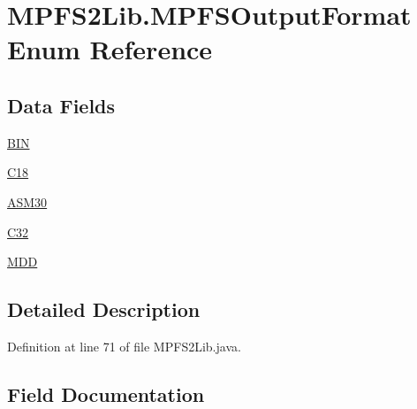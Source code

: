 \hypertarget{enum_microchip_m_p_f_s_1_1_m_p_f_s2_lib_1_1_m_p_f_s_output_format}{}\section{M\+P\+F\+S2\+Lib.\+M\+P\+F\+S\+Output\+Format Enum Reference}
\label{enum_microchip_m_p_f_s_1_1_m_p_f_s2_lib_1_1_m_p_f_s_output_format}
\subsection*{Data Fields}
\begin{DoxyCompactItemize}
\item 
\hyperlink{enum_microchip_m_p_f_s_1_1_m_p_f_s2_lib_1_1_m_p_f_s_output_format_a4cdf0b70265066d6127339b05fd497c1}{B\+I\+N}
\item 
\hyperlink{enum_microchip_m_p_f_s_1_1_m_p_f_s2_lib_1_1_m_p_f_s_output_format_a338879506caa10fad538c03074adf583}{C18}
\item 
\hyperlink{enum_microchip_m_p_f_s_1_1_m_p_f_s2_lib_1_1_m_p_f_s_output_format_acb7365f33cd0e4fd80d250fb72ba39d5}{A\+S\+M30}
\item 
\hyperlink{enum_microchip_m_p_f_s_1_1_m_p_f_s2_lib_1_1_m_p_f_s_output_format_a6ed5f7b9838aba43c103d45888a7dcf3}{C32}
\item 
\hyperlink{enum_microchip_m_p_f_s_1_1_m_p_f_s2_lib_1_1_m_p_f_s_output_format_a243d004bf4bcbc53e81b2d5fecfe17b8}{M\+D\+D}
\end{DoxyCompactItemize}


\subsection{Detailed Description}


Definition at line 71 of file M\+P\+F\+S2\+Lib.\+java.



\subsection{Field Documentation}
\hypertarget{enum_microchip_m_p_f_s_1_1_m_p_f_s2_lib_1_1_m_p_f_s_output_format_acb7365f33cd0e4fd80d250fb72ba39d5}{}
